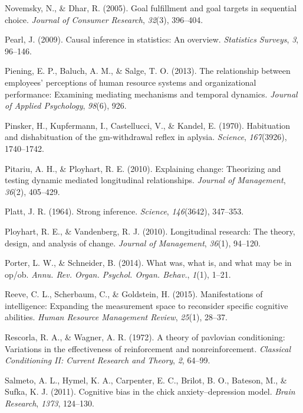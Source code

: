 \documentclass[english,man]{apa6}
\theoremstyle{definition}
\theoremstyle{definition}
\theoremstyle{definition}
\theoremstyle{remark}
\begin{document}
\hypertarget{ref-novemsky2005}{}
Novemsky, N., \& Dhar, R. (2005). Goal fulfillment and goal targets in
sequential choice. \emph{Journal of Consumer Research}, \emph{32}(3),
396--404.

\hypertarget{ref-Pearl2009}{}
Pearl, J. (2009). Causal inference in statistics: An overview.
\emph{Statistics Surveys}, \emph{3}, 96--146.

\hypertarget{ref-piening2013}{}
Piening, E. P., Baluch, A. M., \& Salge, T. O. (2013). The relationship
between employees' perceptions of human resource systems and
organizational performance: Examining mediating mechanisms and temporal
dynamics. \emph{Journal of Applied Psychology}, \emph{98}(6), 926.

\hypertarget{ref-pinsker1970}{}
Pinsker, H., Kupfermann, I., Castellucci, V., \& Kandel, E. (1970).
Habituation and dishabituation of the gm-withdrawal reflex in aplysia.
\emph{Science}, \emph{167}(3926), 1740--1742.

\hypertarget{ref-Pitariu2010}{}
Pitariu, A. H., \& Ployhart, R. E. (2010). Explaining change: Theorizing
and testing dynamic mediated longitudinal relationships. \emph{Journal
of Management}, \emph{36}(2), 405--429.

\hypertarget{ref-platt1964}{}
Platt, J. R. (1964). Strong inference. \emph{Science}, \emph{146}(3642),
347--353.

\hypertarget{ref-Ployhart2010}{}
Ployhart, R. E., \& Vandenberg, R. J. (2010). Longitudinal research: The
theory, design, and analysis of change. \emph{Journal of Management},
\emph{36}(1), 94--120.

\hypertarget{ref-porter2014}{}
Porter, L. W., \& Schneider, B. (2014). What was, what is, and what may
be in op/ob. \emph{Annu. Rev. Organ. Psychol. Organ. Behav.},
\emph{1}(1), 1--21.

\hypertarget{ref-reeve2015}{}
Reeve, C. L., Scherbaum, C., \& Goldstein, H. (2015). Manifestations of
intelligence: Expanding the measurement space to reconsider specific
cognitive abilities. \emph{Human Resource Management Review},
\emph{25}(1), 28--37.

\hypertarget{ref-rescorla1972}{}
Rescorla, R. A., \& Wagner, A. R. (1972). A theory of pavlovian
conditioning: Variations in the effectiveness of reinforcement and
nonreinforcement. \emph{Classical Conditioning II: Current Research and
Theory}, \emph{2}, 64--99.

\hypertarget{ref-salmeto2011}{}
Salmeto, A. L., Hymel, K. A., Carpenter, E. C., Brilot, B. O., Bateson,
M., \& Sufka, K. J. (2011). Cognitive bias in the chick
anxiety--depression model. \emph{Brain Research}, \emph{1373}, 124--130.
\end{document}
